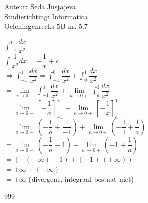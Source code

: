 \documentclass[a4paper]{article}
\newcommand{\integral}{\displaystyle\int}
\newcommand{\limit}{\lim\limits}
\begin{document}
\noindent \large Auteur: Seda Jusjajeva\\
\noindent \large Studierichting: Informatica\\
\noindent \large Oefeningenreeks 5B nr. 5.7\\

\medskip

\normalsize


$\integral_{-1}^{1} \dfrac{dx}{x^2}$ \\

$\integral \dfrac{1}{x^2}dx = -\dfrac{1}{x} + c$ \\

$\Rightarrow\integral_{-1}^{1} \dfrac{dx}{x^2} = \integral_{-1}^{0} \dfrac{dx}{x^2} + \integral_{0}^{1} \dfrac{dx}{x^2}$ \\

$= \limit_{a\to 0-} \integral_{-1}^{a} \dfrac{dx}{x^2} + \limit_{a\rightarrow 0+} \integral_{a}^{1} \dfrac{dx}{x^2}$ \\

$= \limit_{a\to 0-} \left[-\dfrac{1}{x}\right]_{-1}^{a} + \limit_{a\to 0+} \left[-\dfrac{1}{x}\right]_{a}^{1}$ \\

$= \limit_{a\to 0-} \left(-\dfrac{1}{a} + \dfrac{1}{-1}\right) + \limit_{a\to 0+} \left(-\dfrac{1}{1} + \dfrac{1}{a}\right)$ \\

$= \limit_{a\to 0-} \left(-\dfrac{1}{a} - 1\right) + \limit_{a\to 0+} \left(-1 + \dfrac{1}{a}\right)$ \\

$= \left(- (-\infty) - 1\right) + \left(-1 + (+\infty)\right)$ \\

$= +\infty + (+\infty)$ \\

$= +\infty$ (divergent, integraal bestaat niet) \\



\begin{thebibliography}{999}
\end{thebibliography}
\end{document}
